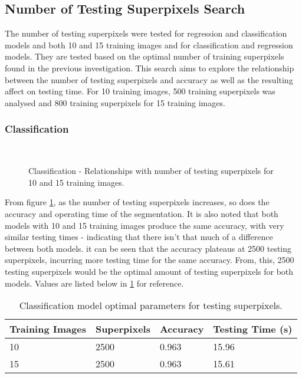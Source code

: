 \subsection{Number of Testing Superpixels Search}
The number of testing superpixels were tested for regression and classification models and both 10 and 15 training images and for classification and regression models. They are tested based on the optimal number of training superpixels found in the previous investigation. This search aims to explore the relationship between the number of testing superpixels and accuracy as well as the resulting affect on testing time. For 10 training images, 500 training superpixels was analysed and 800 training superpixels for 15 training images.

\subsubsection{Classification}
\begin{figure}[H]
    \centering
    \\
    \caption{Classification - Relationships with number of testing superpixels for 10 and 15 training images.}%
    \label{class:testpix}
\end{figure}

From figure \ref{class:testpix}, as the number of testing superpixels increases, so does the accuracy and operating time of the segmentation. It is also noted that both models with 10 and 15 training images produce the same accuracy, with very similar testing times - indicating that there isn't that much of a difference between both models. it can be seen that the accuracy plateaus at 2500 testing superpixels, incurring more testing time for the same accuracy. From, this, 2500 testing superpixels would be the optimal amount of testing superpixels for both models. Values are listed below in \ref{table:classtestpix} for reference.

\begin{table}[H]
\centering
\caption{Classification model optimal parameters for testing superpixels.}

\begin{tabular}{|l|l|l|l|}
\hline
 \textbf{Training Images} &	\textbf{Superpixels} & \textbf{Accuracy} & \textbf{Testing Time (s)}\\
\hline
10 & 2500 & 0.963 & 15.96\\
\hline				    	 			
15 & 2500 & 0.963 & 15.61\\	
\hline		    	 
\end{tabular}
\label{table:classtestpix}
\end{table}

